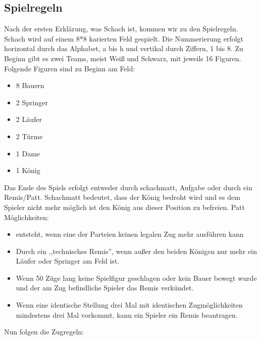 \documentclass[12pt,a4paper]{article}
\begin{document}
{\subsection{Spielregeln}
\label{SUBSEC:GAMERULES}

Nach der ersten Erklärung, was Schach ist, kommen wir zu den Spielregeln.
Schach wird auf einem 8*8 karierten Feld gespielt. Die Nummerierung erfolgt horizontal durch das Alphabet, a bis h und vertikal durch Ziffern, 1 bis 8.
Zu Beginn gibt es zwei Teams, meist Weiß und Schwarz, mit jeweils 16 Figuren.
Folgende Figuren sind zu Beginn am Feld:
\begin{itemize}
	\item{8 Bauern}
	\item{2 Springer}
	\item{2 Läufer}
	\item{2 Türme}
	\item{1 Dame}
	\item{1 König}
\end{itemize}

Das Ende des Spiels erfolgt entweder durch schachmatt, Aufgabe oder durch ein Remis/Patt. Schachmatt bedeutet, dass der König bedroht wird und es dem Spieler nicht mehr möglich ist den König aus dieser Position zu befreien.
Patt Möglichkeiten:
\begin{itemize}
	\item{ entsteht, wenn eine der Parteien keinen legalen Zug mehr ausführen kann }
	\item{Durch ein ,,technisches Remis'', wenn außer den beiden Königen nur mehr ein Läufer oder Springer am Feld ist.}
	\item{Wenn 50 Züge lang keine Spielfigur geschlagen oder kein Bauer bewegt wurde und der am Zug befindliche Spieler das Remis verkündet.}
	\item{Wenn eine identische Stellung drei Mal mit identischen Zugmöglichkeiten mindestens drei Mal vorkommt, kann ein Spieler ein Remis beantragen.}
\end{itemize}

Nun folgen die Zugregeln:

}
\end{document}
